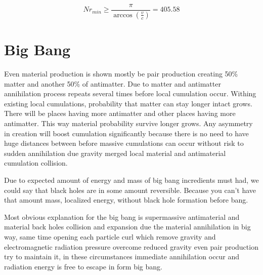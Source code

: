 \begin{equation} \label{eq:minimum_number_of_reflections}
	Nr_{min}\geq
	\frac {\pi}{\arccos(\frac{v}{c})}
	= 405.58
\end{equation}

\section{Big Bang}
\label{big_bang}

Even material production is shown mostly be pair production creating 50\%
matter and another 50\% of antimatter. Due to matter and antimatter
annihilation process repeats several times before local cumulation occur.
Withing existing local cumulations, probability that matter can stay longer
intact grows. There will be places having more antimatter and other places
having more antimatter. This way material probability survive longer grows.
Any asymmetry in creation will boost cumulation significantly because there
is no need to have huge distances between before massive cumulations can
occur without risk to sudden annihilation due gravity merged local material
and antimaterial cumulation collision.

Due to expected amount of energy and mass of big bang incredients must had,
we could say that black holes are in some amount reversible. Because you can't
have that amount mass, localized energy, without black hole formation before
bang.

Most obvious explanation for the big bang is supermassive antimaterial and
material back holes collision and expansion due the material annihilation in big
way, same time opening each particle curl which remove gravity and
electromagnetic radiation pressure overcome reduced gravity even pair production
try to maintain it, in these circumstances immediate annihilation occur and
radiation energy is free to escape in form big bang.


\begin{comment}\end{comment}
